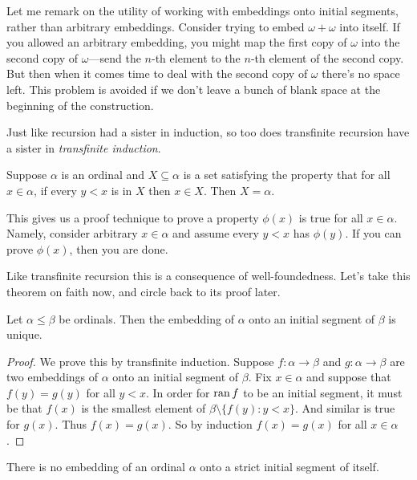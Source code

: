 \documentclass[10pt]{amsart}
\begin{document}
Let me remark on the utility of working with embeddings onto initial segments, rather than arbitrary embeddings. Consider trying to embed $\omega + \omega$ into itself. If you allowed an arbitrary embedding, you might map the first copy of $\omega$ into the second copy of $\omega$---send the $n$-th element to the $n$-th element of the second copy. But then when it comes time to deal with the second copy of $\omega$ there's no space left. This problem is avoided if we don't leave a bunch of blank space at the beginning of the construction.

Just like recursion had a sister in induction, so too does transfinite recursion have a sister in \emph{transfinite induction}. 

\begin{theorem}
Suppose $\alpha$ is an ordinal and $X \subseteq \alpha$ is a set satisfying the property that for all $x \in \alpha$, if every $y < x$ is in $X$ then $x \in X$. Then $X = \alpha$.
\end{theorem}

This gives us a proof technique to prove a property $\phi(x)$ is true for all $x \in \alpha$. Namely, consider arbitrary $x \in \alpha$ and assume every $y < x$ has $\phi(y)$. If you can prove $\phi(x)$, then you are done.

Like transfinite recursion this is a consequence of well-foundedness. Let's take this theorem on faith now, and circle back to its proof later.

\begin{proposition}
Let $\alpha \le \beta$ be ordinals. Then the embedding of $\alpha$ onto an initial segment of $\beta$ is unique.
\end{proposition}

\begin{proof}
We prove this by transfinite induction. Suppose $f : \alpha \to \beta$ and $g : \alpha \to \beta$ are two embeddings of $\alpha$ onto an initial segment of $\beta$. Fix $x \in \alpha$ and suppose that $f(y) = g(y)$ for all $y < x$. In order for $\operatorname{ran} f$ to be an initial segment, it must be that $f(x)$ is the smallest element of $\beta \setminus \{ f(y) : y < x \}$. And similar is true for $g(x)$. Thus $f(x) = g(x)$. So by induction $f(x) = g(x)$ for all $x \in \alpha$.
\end{proof}

\begin{corollary}
There is no embedding of an ordinal $\alpha$ onto a strict initial segment of itself.
\end{corollary}
\end{document}
